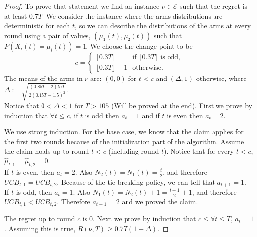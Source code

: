 \documentclass[opre,nonblindrev]{informs3} %
\begin{document}
\begin{proof}
To prove that statement we find an instance $\nu \in \mathcal{E}$ such that the regret is at least $0.7T$. We consider the instance where the arms distributions are deterministic for each $t$, so we can describe the distributions of the arms at every round using a pair of values, $(\mu_1(t), \mu_2(t))$ such that $P(X_i(t)=\mu_i(t)) = 1$. We choose the change point to be
\[ c = 
\begin{cases}
    \lfloor0.3T\rfloor & \text{if $\lfloor0.3T\rfloor$ is odd,} \\
    \lfloor0.3T\rfloor-1 & \text{otherwise}.
\end{cases}
\]
The means of the arms in $\nu$ are: $(0, 0)$ for $t<c$ and $(\Delta,1)$ otherwise, where $\Delta := \sqrt{\frac{(0.85T-2)lnT}{2(0.15T-1.5)^2}}$. \\
Notice that $0 < \Delta < 1$ for $T > 105$ (Will be proved at the end).
First we prove by induction that $\forall t\leq c$, if $t$ is odd then $a_t = 1$ and if $t$ is even then $a_t = 2$.

We use strong induction. For the base case, we know that the claim applies for the first two rounds because of the initialization part of the algorithm. Assume the claim holds up to round $t<c$ (including round $t$). Notice that for every $t<c$, $\hat{\mu}_{t, 1} = \hat{\mu}_{t, 2} = 0$.\\
If $t$ is even, then $a_t = 2$. Also $N_2(t) = N_1(t) = \frac{t}{2}$, and therefore $UCB_{t, 1} = UCB_{t, 2}$. Because of the tie breaking policy, we can tell that $a_{t+1} = 1$.\\
If $t$ is odd, then $a_t = 1$. Also $N_1(t) = N_2(t) + 1 = \frac{t-1}{2} + 1$, and therefore $UCB_{t, 1} < UCB_{t, 2}$. Therefore $a_{t+1} = 2$ and we proved the claim.

The regret up to round $c$ is 0. Next we prove by induction that $c \leq \forall t \leq T$, $a_t = 1$. Assuming this is true, $R(\nu, T) \geq 0.7T(1-\Delta)$.


\end{proof}
\end{document}
